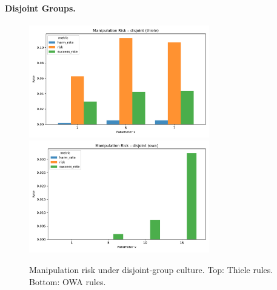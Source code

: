 \documentclass[11pt]{article}
\begin{document}
\paragraph{Disjoint Groups.}
\begin{figure}[h!]
\centering
\includegraphics[width=0.7\textwidth]{figures/risk_disjoint_thiele.pdf}
\includegraphics[width=0.7\textwidth]{figures/risk_disjoint_owa.pdf}
\caption{Manipulation risk under disjoint-group culture. Top: Thiele rules. Bottom: OWA rules.}
\end{figure}
\end{document}
